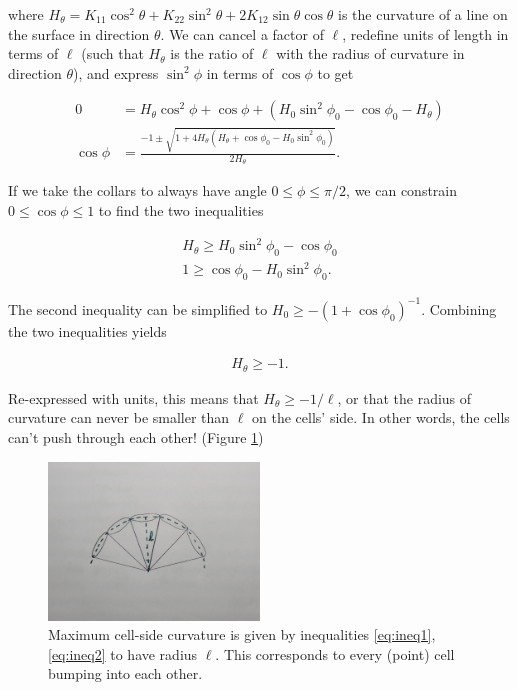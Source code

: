\noindent where $H_\theta = K_{11}\cos^2\theta + K_{22}\sin^2\theta + 2K_{12}\sin\theta\cos\theta$ is the curvature of a line on the surface in direction $\theta$. We can cancel a factor of $\ell$, redefine units of length in terms of $\ell$ (such that $H_\theta$ is the ratio of $\ell$ with the radius of curvature in direction $\theta$), and express $\sin^2\phi$ in terms of $\cos\phi$ to get

\begin{align*}
    0 &= H_\theta \cos^2\phi + \cos\phi + (H_0\sin^2\phi_0 - \cos\phi_0 - H_\theta) \\
    \cos\phi &= \frac{-1 \pm \sqrt{1 + 4H_\theta (H_\theta + \cos\phi_0 - H_0\sin^2\phi_0)}}{2H_\theta}.
\end{align*}

If we take the collars to always have angle $0 \leq \phi \leq \pi/2$, we can constrain $0 \leq \cos\phi \leq 1$ to find the two inequalities 

\begin{align}
    H_\theta \geq H_0 \sin^2\phi_0 - \cos\phi_0 \label{eq:ineq1}\\
    1 \geq \cos\phi_0 - H_0 \sin^2\phi_0. \label{eq:ineq2}
\end{align}

\noindent The second inequality can be simplified to $H_0 \geq -(1+\cos\phi_0)^{-1}$. Combining the two inequalities yields 

\begin{align}
    H_\theta \geq -1. \label{eq:hlb}
\end{align}

\noindent Re-expressed with units, this means that $H_\theta \geq -1/\ell$, or that the radius of curvature can never be smaller than $\ell$ on the cells' side. In other words, the cells can't push through each other! (Figure \ref{fig:maxcurv})

\begin{figure}[hbtp]
    \centering
    \includegraphics[width=0.5\textwidth]{arc.jpg}
    \caption[Minimum sheet curvature permitted in the continuous sheet description]{Maximum cell-side curvature is given by inequalities \ref{eq:ineq1}, \ref{eq:ineq2} to have radius $\ell$. This corresponds to every (point) cell bumping into each other.}
    \label{fig:maxcurv}
\end{figure}


